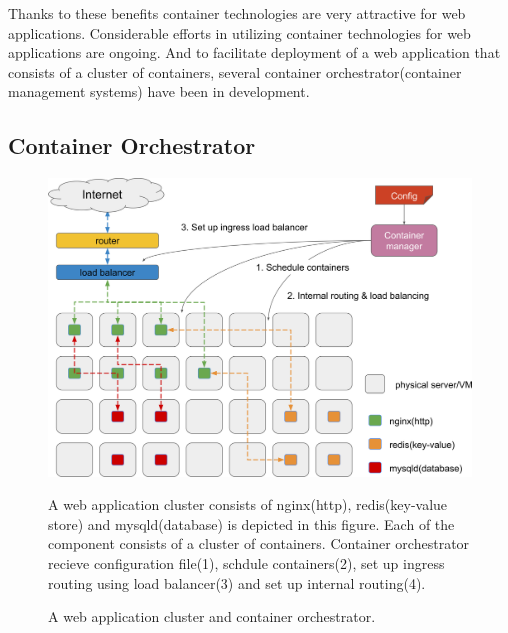 Thanks to these benefits container technologies are very attractive for web applications.
Considerable efforts in utilizing container technologies for web applications are ongoing.
And to facilitate deployment of a web application that consists of a cluster of containers, several container orchestrator(container management systems) have been in development.

\subsection{Container Orchestrator}

\begin{figure}[h]
\begin{center}
\includegraphics[width=0.9\columnwidth]{Figs/container_management_system}
\end{center}
\caption{
A web application cluster and container orchestrator.
}

A web application cluster consists of nginx(http), redis(key-value store) and mysqld(database) is depicted in this figure. 
Each of the component consists of a cluster of containers.
Container orchestrator recieve configuration file(1), schdule containers(2), set up ingress routing using load balancer(3) and set up internal routing(4).

\label{fig:container_management_system}
\end{figure}

